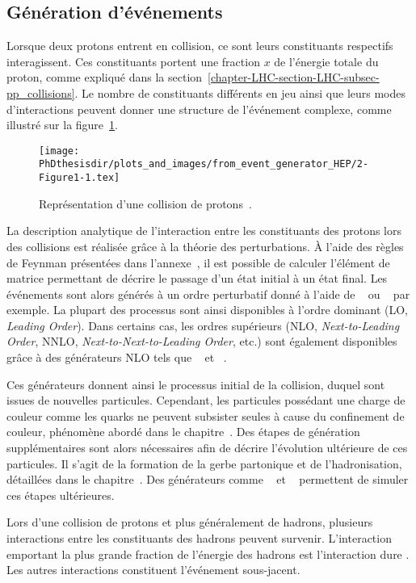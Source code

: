 \subsection{Génération d'événements}\label{chapter-LHC-section-MC-subsec-evt_gen}
Lorsque deux protons entrent en collision, ce sont leurs constituants respectifs interagissent.
Ces constituants portent une fraction $x$ de l'énergie totale du proton, comme expliqué dans la section~\ref{chapter-LHC-section-LHC-subsec-pp_collisions}.
Le nombre de constituants différents en jeu ainsi que leurs modes d'interactions peuvent donner une structure de l'événement complexe, comme illustré sur la figure~\ref{fig-event_generator_HEP-2-Figure1-1}.
\begin{figure}[h]
\centering
\texttt{[image: \\PhDthesisdir/plots\_and\_images/from\_event\_generator\_HEP/2-Figure1-1.tex]}
\caption[Représentation d'une collision de protons.]{Représentation d'une collision de protons~\cite{event_generator_HEP}.}
\label{fig-event_generator_HEP-2-Figure1-1}
\end{figure}
\par La description analytique de l'interaction entre les constituants des protons lors des collisions est réalisée grâce à la théorie des perturbations.
À l'aide des règles de Feynman présentées dans l'annexe~, il est possible de calculer l'\og élément de matrice \fg{} permettant de décrire le passage d'un état initial à un état final.
Les événements sont alors générés à un ordre perturbatif donné à l'aide de
\MADGRAPH~\cite{madgraph5}
ou
\PYTHIA~\cite{pythia6.4,pythia8.2}
par exemple.
La plupart des processus sont ainsi disponibles à l'ordre dominant (LO, \emph{Leading Order}).
Dans certains cas, les ordres supérieurs (NLO, \emph{Next-to-Leading Order}, NNLO, \emph{Next-to-Next-to-Leading Order}, etc.) sont également disponibles grâce à des générateurs NLO tels que
\POWHEG~\cite{Alioli:2010xd} et
\MCATNLO~\cite{MCATNLO}.
\par Ces générateurs donnent ainsi le processus initial de la collision, duquel sont issues de nouvelles particules.
Cependant, les particules possédant une charge de couleur comme les quarks ne peuvent subsister seules à cause du confinement de couleur, phénomène abordé dans le chapitre~.
Des étapes de génération supplémentaires sont alors nécessaires afin de décrire l'évolution ultérieure de ces particules.
Il s'agit de la formation de la gerbe partonique et de l'hadronisation, détaillées dans le chapitre~.
Des générateurs comme
\PYTHIA~\cite{pythia6.4,pythia8.2} et
\HERWIG~\cite{herwig}
permettent de simuler ces étapes ultérieures.
\par Lors d'une collision de protons et plus généralement de hadrons, plusieurs interactions entre les constituants des hadrons peuvent survenir.
L'interaction emportant la plus grande fraction de l'énergie des hadrons est l'\og interaction dure \fg{}.
Les autres interactions constituent l'événement sous-jacent.
